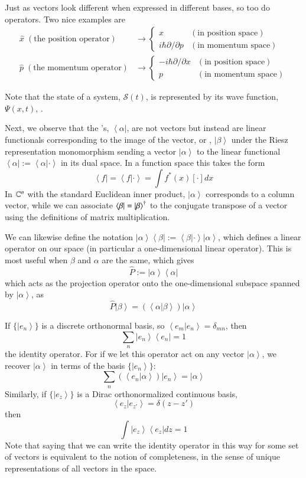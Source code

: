 \documentclass[12pt, a4paper, oneside, openright, titlepage]{book}
\newcommand{\bra}[1]{\left\langle#1\right\vert}
\newcommand{\ket}[1]{\left\vert#1\right\rangle}
\newcommand{\braket}[2]{\left\langle#1\right\vert\left.#2\right\rangle}
\begin{document}
Just as vectors look different when expressed in different bases, so too do operators. Two nice examples are \begin{align*}
    \hat{x}\;(\text{the position operator}) &\rightarrow \left\{\begin{array}{lc} x & (\text{in position space}) \\ i\hbar\partial/\partial p & (\text{in momentum space}) \end{array}\right. \\
    \hat{p}\;(\text{the momentum operator}) &\rightarrow \left\{\begin{array}{lc} -i\hbar\partial/\partial x & (\text{in position space}) \\ p & (\text{in momentum space}) \end{array}\right.
\end{align*}

Note that the state of a system, $\mathcal{S}(t)$, is represented by its wave function, $\Psi(x,t)$, .

Next, we observe that the 's, $\bra{\alpha}$, are not vectors but instead are linear functionals corresponding to the image of the vector, or , $\ket{\beta}$ under the Riesz representation monomorphism sending a vector $\ket{\alpha}$ to the linear functional $\bra{\alpha} := \braket{\alpha}{\cdot}$ in its dual space. In a function space this takes the form $$\bra{f} = \braket{f}{\cdot} = \int f^*(x)[\cdot]dx$$
In $\mathbb C^n$ with the standard Euclidean inner product, $\ket{\alpha}$ corresponds to a column vector, while we can associate $\bra{\beta} = \ket{\beta}^{\text{\textdagger}}$ to the conjugate transpose of a vector using the definitions of matrix multiplication.

We can likewise define the notation $\ket{\alpha}\bra{\beta} := \braket{\beta}{\cdot}\ket{\alpha}$, which defines a linear operator on our space (in particular a one-dimensional linear operator). This is most useful when $\beta$ and $\alpha$ are the same, which gives $$\hat{P} := \ket{\alpha}\bra{\alpha}$$ which acts as the projection operator onto the one-dimensional subspace spanned by $\ket{\alpha}$, as $$\hat{P}\ket{\beta} = (\braket{\alpha}{\beta})\ket{\alpha}$$

If $\{\ket{e_n}\}$ is a discrete orthonormal basis, so $\braket{e_m}{e_n} = \delta_{mn}$, then $$\sum_n\ket{e_n}\bra{e_n} = 1$$ the identity operator. For if we let this operator act on any vector $\ket{\alpha}$, we recover $\ket{\alpha}$ in terms of the basis $\{\ket{e_n}\}$: $$\sum_{n}(\braket{e_n}{\alpha})\ket{e_n} = \ket{\alpha}$$ Similarly, if $\{\ket{e_z}\}$ is a Dirac orthonormalized continuous basis, $$\braket{e_z}{e_{z'}} = \delta(z-z')$$ then $$\int\ket{e_z}\bra{e_z}dz = 1$$
Note that saying that we can write the identity operator in this way for some set of vectors is equivalent to the notion of completeness, in the sense of unique representations of all vectors in the space.
\end{document}
